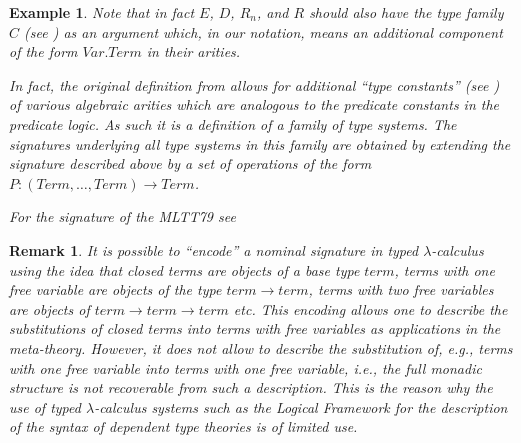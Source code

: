 \documentclass[11pt]{article}
\newtheorem{example}[proposition]{Example}
\newtheorem{remark}[proposition]{Remark}
\newcommand{\comment}[1]{}
\newcommand{\sr}{\rightarrow}
\begin{document}
{\begin{example}
Note that in fact $E$, $D$, $R_n$, and $R$ should also have the type family $C$ (see \cite[2.3.6, 2.3.8, 2.3.10, 2.3.12]{ML72}) as an argument which, in our notation, means an additional component of the form $Var.Term$ in their arities.  

In fact, the original definition from \cite{ML72} allows for additional ``type constants'' (see \cite[2.2.1]{ML72}) of various algebraic arities which are analogous to the predicate constants in the predicate logic. As such it is a definition of a family of type systems. The signatures underlying all type systems in this family are obtained by extending the signature described above by a set of operations of the form $P:(Term,\dots,Term)\sr Term$. 

For the signature of the MLTT79 see \cite[p. 158]{MLTT79}
\end{example}
%
\begin{remark}\rm
It is possible to ``encode'' a nominal signature in typed $\lambda$-calculus using the idea that closed terms are objects of a base type $term$, terms with one free variable are objects of the type $term\sr term$, terms with two free variables are objects of $term\sr term\sr term$ etc. This encoding allows one to describe the substitutions of closed terms into terms with free variables as applications in the meta-theory.  However, it does not allow to describe the substitution of, e.g., terms with one free variable into terms with one free variable, i.e., the full monadic structure is not recoverable from such a description. This is the reason why the use of typed $\lambda$-calculus systems such as the Logical Framework for the description of the syntax of dependent type theories is of limited use.
\end{remark}
%



\comment{To be more precise, the input data consists of a nominal signature $\Sigma$ with one name-sort and a set of data-sorts $\bf D$, a distinguished data-sort $Term\in {\bf D}$, a subset of data-sorts ${\bf Type}\subset {\bf D}$ and a family of sets $(P_{D})_{D\in {\bf D}-\{Term\}}$ parametrized by data-sorts distinct from $Term$. For such a quadruple we describe a monad $R$ such that $R(X)$ is the set of $\alpha$-equivalence classes of expressions of sort $Term$ with variables from the name-space 
%
$$varnames := {\bf A}\amalg X\amalg (\amalg_{D\in {\bf D}-\{Term\}} P_D)$$
%
where ${\bf A}$ is a countable set, all occurrences of variables from ${\bf A}$ are bound and all occurrences of variables from $X\coprod (\coprod_{D\in {\bf D}-\{Term\}} P_D)$ are free. Note that $R(X)$ depends, up to a canonical isomorphism, only on $X$ but not on the choice of a countable set ${\bf A}$.  We also describe a left module $LM$ over $R$ such that $LM(X)$ is the disjoint union of $\alpha$-equivalence classes of similar expressions of sorts $D$ for $D\in {\bf Type}$. 

}}
\end{document}
